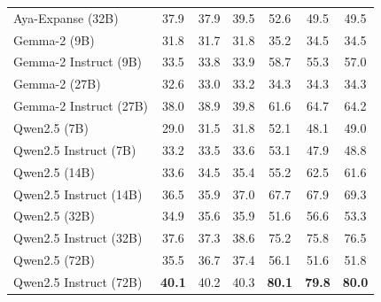 \begin{table}[t]
{\begin{tabular}{lcccccc}
Aya-Expanse (32B)                             & 37.9         & 37.9            & 39.5                      & 52.6          & 49.5            & 49.5                       \\
\hdashline
Gemma-2 (9B)                                  & 31.8         & 31.7           & 31.8                     & 35.2         & 34.5           & 34.5                      \\
Gemma-2 Instruct (9B)                         & 33.5         & 33.8            & 33.9                     & 58.7          & 55.3           & 57.0                      \\
Gemma-2 (27B)                                 & 32.6         & 33.0            & 33.2                      & 34.3         & 34.3           & 34.3                      \\
Gemma-2 Instruct (27B)                        & 38.0         & 38.9           & 39.8                      & 61.6         & 64.7           & 64.2                      \\
\hdashline
Qwen2.5 (7B)                                  & 29.0         & 31.5           & 31.8                     & 52.1         & 48.1           & 49.0                      \\
Qwen2.5 Instruct (7B)                         & 33.2         & 33.5           & 33.6                     & 53.1         & 47.9           & 48.8                      \\
Qwen2.5 (14B)                                 & 33.6         & 34.5            & 35.4                      & 55.2          & 62.5            & 61.6                       \\
Qwen2.5 Instruct (14B)                        & 36.5         & 35.9            & 37.0                      & 67.7         & 67.9            & 69.3                       \\
Qwen2.5 (32B)                                 & 34.9         & 35.6           & 35.9                     & 51.6         & 56.6           & 53.3                      \\
Qwen2.5 Instruct (32B)                        & 37.6         & 37.3           & 38.6                     & 75.2         & 75.8           & 76.5                      \\
Qwen2.5 (72B)                                 & 35.5         & 36.7           & 37.4                     & 56.1         & 51.6           & 51.8                      \\
Qwen2.5 Instruct (72B)                        & \textbf{40.1}         & 40.2           & 40.3                     & \textbf{80.1}         & \textbf{79.8}           & \textbf{80.0}                      \\

\end{tabular}}
\end{table}
